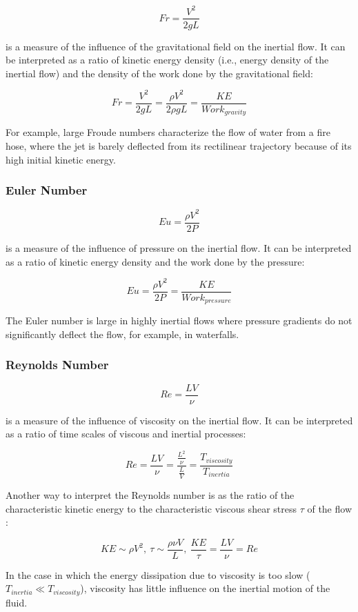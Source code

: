 $$ Fr = \frac{V^2}{2gL} $$

is a measure of the influence of the gravitational field on the inertial flow. It can be interpreted as a ratio of kinetic energy density (i.e., energy density of the inertial flow) and the density of the work done by the gravitational field:

$$ Fr = \frac{V^2}{2gL}  = \frac{\rho V^2}{2\rho g L} = \frac{KE}{Work_{gravity}}$$

For example, large Froude numbers characterize the flow of water from a fire hose, where the jet is barely deflected from its rectilinear trajectory because of its high initial kinetic energy.

\subsubsection{Euler Number}

$$ Eu = \frac{\rho V^2}{2P} $$

is a measure of the influence of pressure on the inertial flow. It can be interpreted as a ratio of kinetic energy density and the work done by the pressure:

$$ Eu = \frac{\rho V^2}{2P} = \frac{KE}{Work_{pressure}} $$

The Euler number is large in highly inertial flows where pressure gradients do not significantly deflect the flow, for example, in waterfalls.

\subsubsection{Reynolds Number}

$$ Re = \frac{LV}{\nu} $$

is a measure of the influence of viscosity on the inertial flow. It can be interpreted as a ratio of time scales of viscous and inertial processes:

$$ Re = \frac{LV}{\nu}  = \frac{\frac{L^2}{\nu}}{\frac{L}{V}} = \frac{T_{viscosity}}{T_{inertia}}$$

Another way to interpret the Reynolds number is as the ratio of the characteristic kinetic energy to the characteristic viscous shear stress $\tau$ of the flow \cite[p. 484]{sivukhin}:

$$ KE \sim \rho V^2,~ \tau \sim \frac{\rho \nu V}{L},~ \frac{KE}{\tau} = \frac{LV}{\nu} = Re $$

In the case in which the energy dissipation due to viscosity is too slow ($ T_{inertia} \ll T_{viscosity}$), viscosity has little influence on the inertial motion of the fluid.

